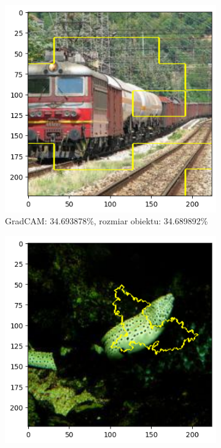 
\begin{figure}[h]
	\centering
	\begin{subfigure}[b]{0.3\textwidth}
		\includegraphics[width=.9\textwidth]{img/examples/appendix/n03272562_40246_gradcam}
		\caption{GradCAM: 34.693878\%, rozmiar obiektu: 34.689892\%}
	\end{subfigure}
	\begin{subfigure}[b]{0.3\textwidth}
		\includegraphics[width=.9\textwidth]{img/examples/appendix/n02526121_01747_lime}

\end{subfigure}
\end{figure}
